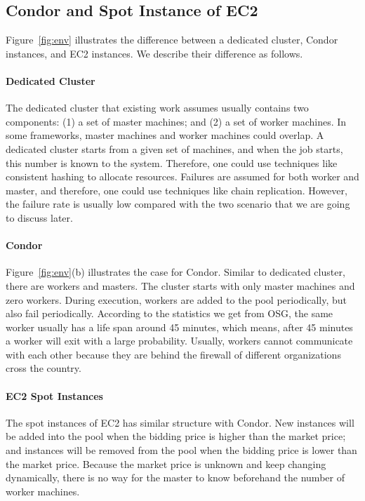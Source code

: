 \documentclass[11pt]{article}
\begin{document}
\subsection{Condor and Spot Instance of EC2}

Figure~\ref{fig:env} illustrates the difference between
a dedicated cluster, Condor instances, and EC2 instances.
We describe their difference as follows.

\paragraph*{Dedicated Cluster} The dedicated cluster
that existing work assumes usually contains two components:
(1) a set of master machines; and (2) a set of worker machines.
In some frameworks, master machines and worker machines
could overlap. A dedicated cluster starts from a given
set of machines, and when the job starts, this number is
known to the system. Therefore, one could use techniques
like consistent hashing to allocate resources. Failures
are assumed for both worker and master, and therefore,
one could use techniques like chain replication. However,
the failure rate is usually low compared with the two scenario
that we are going to discuss later.

\paragraph*{Condor} Figure~\ref{fig:env}(b) illustrates
the case for Condor. Similar to dedicated cluster, there
are workers and masters. The cluster starts with only
master machines and zero workers. During execution,
workers are added to the pool periodically, but also
fail periodically. According to the statistics we get
from OSG, the same worker usually has a life span around
45 minutes, which means, after 45 minutes a worker will
exit with a large probability. Usually, workers cannot 
communicate with each other
because they are behind the firewall of different organizations
cross the country.

\paragraph*{EC2 Spot Instances} The spot instances
of EC2 has similar structure with Condor. New instances
will be added into the pool when the bidding price is
higher than the market price; and instances will be removed
from the pool when the bidding price is lower than
the market price. Because the market price is unknown and
keep changing dynamically, there is no way for the master
to know beforehand the number of worker machines.
\end{document}
